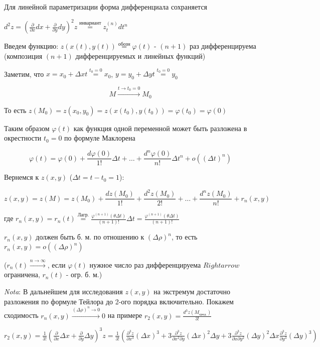 \documentclass[12pt]{article}
\begin{document}
    Для линейной параметризации форма дифференциала сохраняется

    $\displaystyle d^2 z = (\frac{\partial }{\partial x}dx + \frac{\partial}{\partial y}dy)^2 z \stackrel{\text{инвариант}}{=} z^{(n)}_t dt^n$

    Введем функцию: $z(x(t), y(t)) \stackrel{\text{обозн}}{=} \varphi (t)$ - $(n + 1)$ раз дифференцируема (композиция $(n + 1)$ дифференцируемых и линейных функций)

    Заметим, что $x = x_0 + \Delta x t \stackrel{t_0 = 0}{=} x_0$, $y = y_0 + \Delta y t \stackrel{t_0 = 0}{=} y_0$

    \[M \stackrel{t \to t_0 = 0}{\rightarrow} M_0\]

    То есть $z(M_0) = z(x_0, y_0) = z(x(t_0), y(t_0)) = \varphi (t_0) = \varphi(0)$

    Таким образом $\varphi(t)$ как функция одной переменной может быть разложена в окрестности $t_0 = 0$ по формуле Маклорена

    \[\varphi(t) = \varphi(0) + \frac{d\varphi(0)}{1!} \Delta t + \dots + \frac{d^{n}\varphi(0)}{n!} \Delta t^n + o((\Delta t)^n)\]

    Вернемся к $z(x, y)$ ($\Delta t = t - t_0 = 1$):

    \[z(x, y) = z(M) = z(M_0) + \frac{dz(M_0)}{1!} + \frac{d^2 z(M_0)}{2!} + \dots + \frac{d^n z(M_0)}{n!} + r_n(x, y)\]

    где $\displaystyle r_n(x, y) = r_n(t) \stackrel{\text{Лагр.}}{=} \frac{\varphi^{(n+1)}(\theta \Delta t)}{(n + 1)!} \Delta t = \frac{\varphi^{(n+1)}(\theta \Delta t)}{(n + 1)!}$

    $r_n(x, y)$ должен быть б. м. по отношению к $(\Delta \rho)^n$, то есть $r_n(x, y) = o((\Delta \rho)^n)$

    ($r_n(t) \stackrel{n \to \infty}{\rightarrow}$, если $\varphi(t)$ нужное число раз дифференцируема $Rightarrow$ ограничена, $r_n(t)$ - огр. б. м.)

    \vspace{3mm}
\textit{Nota}: В дальнейшем для исследования $z(x, y)$ на экстремум достаточно разложения по формуле Тейлора до 2-ого порядка включительно.
    Покажем сходимость $r_n(x, y) \stackrel{(\Delta \rho)^n \to 0}{\rightarrow} 0$ на примере $\displaystyle r_2 (x, y) = \frac{d^3 z(M_{\text{сред.}})}{3!}$


    $\displaystyle r_2(x, y) = \frac{1}{3!} (\frac{\partial}{\partial x} \Delta x + \frac{\partial}{\partial y} \Delta y)^3 z =
    \frac{1}{3!} (\frac{\partial^3 z}{\partial x^3} (\Delta x)^3 + 3 \frac{\partial^3 z}{\partial x^2 \partial y} (\Delta x)^2 \Delta y +
    3 \frac{\partial^3 z}{\partial x \partial y^2} (\Delta y)^2 \Delta x \frac{\partial^3 z}{\partial y^3} (\Delta y)^3)$
\end{document}
